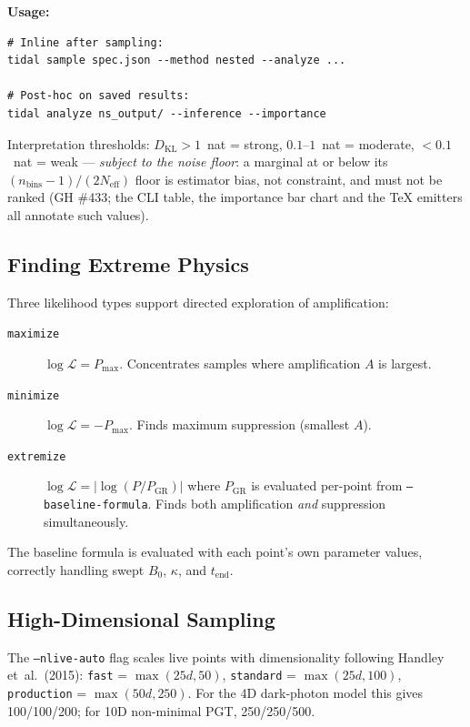 \textbf{Usage:}
\begin{verbatim}
# Inline after sampling:
tidal sample spec.json --method nested --analyze ...

# Post-hoc on saved results:
tidal analyze ns_output/ --inference --importance
\end{verbatim}

Interpretation thresholds: $D_\mathrm{KL} > 1$~nat = strong,
$0.1$--$1$~nat = moderate, $< 0.1$~nat = weak --- \emph{subject to the
noise floor}: a marginal at or below its
$(n_\mathrm{bins}-1)/(2N_\mathrm{eff})$ floor is estimator bias, not
constraint, and must not be ranked (GH \#433; the CLI table, the
importance bar chart and the TeX emitters all annotate such values).

\subsection{Finding Extreme Physics}
\label{sec:inference-extremize}

Three likelihood types support directed exploration of amplification:

\begin{description}
  \item[\texttt{maximize}] $\log\mathcal{L} = P_\mathrm{max}$.
    Concentrates samples where amplification $A$ is largest.
  \item[\texttt{minimize}] $\log\mathcal{L} = -P_\mathrm{max}$.
    Finds maximum suppression (smallest $A$).
  \item[\texttt{extremize}] $\log\mathcal{L} = |\log(P / P_\mathrm{GR})|$
    where $P_\mathrm{GR}$ is evaluated per-point from
    \texttt{--baseline-formula}.  Finds both amplification \emph{and}
    suppression simultaneously.
\end{description}

The baseline formula is evaluated with each point's own parameter values,
correctly handling swept $B_0$, $\kappa$, and $t_\mathrm{end}$.

\subsection{High-Dimensional Sampling}
\label{sec:inference-highdim}

The \texttt{--nlive-auto} flag scales live points with dimensionality
following Handley et~al.\ (2015): \texttt{fast} = $\max(25d, 50)$,
\texttt{standard} = $\max(25d, 100)$, \texttt{production} =
$\max(50d, 250)$.  For the 4D dark-photon model this gives 100/100/200;
for 10D non-minimal PGT, 250/250/500.

